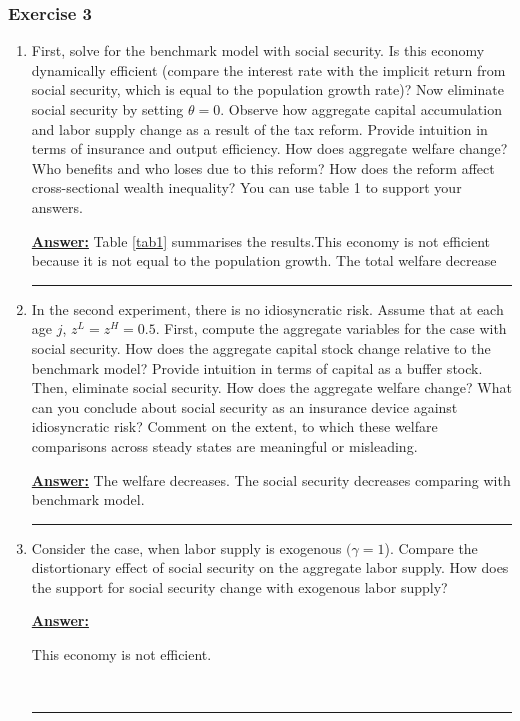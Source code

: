 \documentclass{article} %
\theoremstyle{definition}
\newenvironment{solution}[1][Answer]{\begin{singlespace}\underline{\textbf{#1:}}\quad }{\ \rule{0.3em}{0.3em}\end{singlespace}} %
\begin{document}
\subsubsection*{Exercise 3}
\begin{enumerate}
\item First, solve for the benchmark model with social security. Is this economy dynamically efficient (compare the interest rate with the implicit return from social security, which is equal to the population growth rate)? Now eliminate social security by setting $ \theta = 0 $. Observe how aggregate capital accumulation and labor supply change as a result of the tax reform. Provide intuition in terms of insurance and output efficiency. How does aggregate welfare change? Who benefits and who loses due to this reform? How does the reform affect cross-sectional wealth inequality? You can use table 1 to support your answers.
  \begin{solution}
    Table \ref{tab1} summarises the results.This economy is not efficient because it is not equal to the population growth. The total welfare decrease
  \end{solution}

\item In the second experiment, there is no idiosyncratic risk. Assume that at each age $ j $, $ z^L = z^H = 0.5. $ First, compute the aggregate variables for the case with social security. How does the aggregate capital stock change relative to the benchmark model? Provide intuition in terms of capital as a buffer stock. Then, eliminate social security. How does the aggregate welfare change? What can you conclude about social security as an insurance device against idiosyncratic risk? Comment on the extent, to which these welfare comparisons across steady states are meaningful or misleading.
  \begin{solution}
    The welfare decreases. The social security decreases comparing with benchmark model. 
  \end{solution}
  
\item Consider the case, when labor supply is exogenous $ (\gamma = 1 $). Compare the distortionary effect of social security on the aggregate labor supply. How does the support for social security change with exogenous labor supply?
  \begin{solution}

    This economy is not efficient.



\end{solution}
\end{enumerate}
\end{document}
